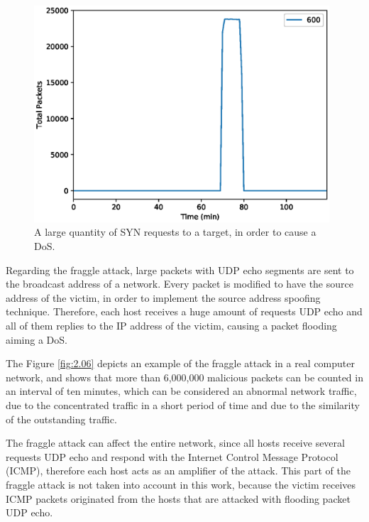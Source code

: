 \begin{figure}[h!]
     \centering 
     \includegraphics[width=11cm]{figures/ch2/synflood_traffic.eps}
     \caption{A large quantity of SYN requests to a target, in order to cause a DoS.}
     \label{fig:2.05}
\end{figure}

Regarding the fraggle attack, large packets with UDP echo segments are sent to the broadcast address of a network. Every packet is modified to have the source address of the victim, in order to implement the source address spoofing technique. Therefore, each host receives a huge amount of requests UDP echo and all of them replies to the IP address of the victim, causing a packet flooding aiming a DoS. 

The Figure \ref{fig:2.06} depicts an example of the fraggle attack in a real computer network, and shows that more than 6,000,000 malicious packets can be counted in an interval of ten minutes, which can be considered an abnormal network traffic, due to the concentrated traffic in a short period of time and due to the similarity of the outstanding traffic.

The fraggle attack can affect the entire network, since all hosts receive several requests UDP echo and respond with the  Internet Control Message Protocol (ICMP), therefore each host acts as an amplifier of the attack. This part of the fraggle attack is not taken into account in this work, because the victim receives ICMP packets originated from the hosts that are attacked with flooding packet UDP echo. 

